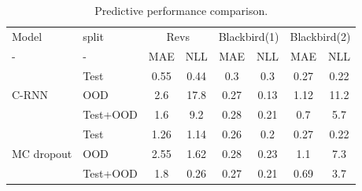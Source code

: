 \documentclass[../main.tex]{subfiles}
\begin{document}

        

\begin{table}[htbp]
\centering
    \begin{tabular}{l l c c c c c c}  
        \toprule
        Model & split & \multicolumn{2}{c}{Revs} & \multicolumn{2}{c}{Blackbird(1)} & \multicolumn{2}{c}{Blackbird(2)}\\
        - & - & MAE & NLL & MAE & NLL & MAE & NLL \\
        \midrule
        \multirow{3}{*}{C-RNN} 
            & Test     & 0.55 & 0.44 & 0.3  & 0.3   & 0.27 & 0.22 \\  
            & OOD      & 2.6  & 17.8 & 0.27 & 0.13  & 1.12 & 11.2\\  
            & Test+OOD & 1.6  & 9.2  & 0.28 & 0.21  & 0.7  & 5.7\\ 

        \midrule
        \multirow{3}{*}{MC dropout} 
            & Test     & 1.26 & 1.14 & 0.26  & 0.2   & 0.27 & 0.22 \\  
            & OOD      & 2.55 & 1.62 & 0.28  & 0.23  & 1.1  &  7.3 \\  
            & Test+OOD & 1.8  & 0.26 & 0.27  & 0.21  & 0.69 & 3.7\\ 
        
        \toprule
    \end{tabular}
    \caption{Predictive performance comparison.}
    \label{tbl:comparison}
\end{table}
\end{document}
